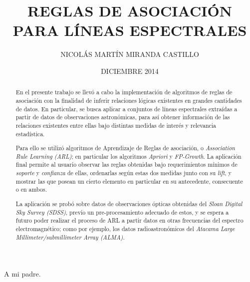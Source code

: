\documentclass[upright, contnum]{umemoria}
\author{NICOL\'AS MART\'IN MIRANDA CASTILLO}
\title{REGLAS DE ASOCIACI\'ON PARA L\'INEAS ESPECTRALES}
\date{DICIEMBRE 2014}
\begin{document}
\frontmatter
\maketitle

\begin{abstract}
En el presente trabajo se llevó a cabo la implementación de algoritmos de reglas de asociación con la finalidad de inferir relaciones lógicas existentes en grandes cantidades de datos. En particular, se busca aplicar a conjuntos de líneas espectrales extraídas a partir de datos de observaciones astronómicas, para así obtener información de las relaciones existentes entre ellas bajo distintas medidas de interés y relevancia estadística.

Para ello se utilizó algoritmos de Aprendizaje de Reglas de asociación, o \textit{Association Rule Learning (ARL)}; en particular los algoritmos \textit{Apriori} y \textit{FP-Growth}. La aplicación final permite al usuario observar las reglas obtenidas bajo requerimientos mínimos de \textit{soporte} y \textit{confianza} de ellas, ordenarlas según estas dos medidas junto con su \textit{lift}, y mostrar las que posean un cierto elemento en particular en su antecedente, consecuente o en ambos.

La aplicación se probó sobre datos de observaciones ópticas obtenidas del \textit{Sloan Digital Sky Survey (SDSS)}, previo un pre-procesamiento adecuado de estos, y se espera a futuro poder realizar el proceso de ARL a partir datos en otras frecuencias del espectro electromagnético; como por ejemplo, los datos radioastronómicos del \textit{Atacama Large Millimeter/submillimeter Array (ALMA)}.
\end{abstract}

\begin{dedicatoria}
A mi padre.
\end{dedicatoria}
\end{document}
